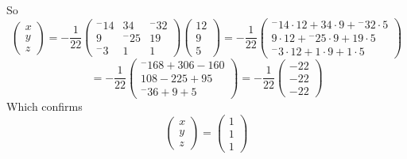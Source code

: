 \documentclass{article}
\begin{document}
\begin{enumerate}
\begin{enumerate}[i.]
So
\[
	\left(
		\begin{array}{c}
			x \\
			y \\
			z
		\end{array}
	\right)
	=
	-\frac{1}{22}
	\left(
		\begin{array}{ccc}
		 {^-}14 &          34 &  {^-}32 \\
		           9 &  {^-}25 &         19  \\
 		    {^-}3 &           1 &           1
		\end{array}	
	\right)
	\left(
		\begin{array}{c}
			12 \\
			9 \\
			5
		\end{array}
	\right)
	=
	-\frac{1}{22}
	\left(
		\begin{array}{c}
			 {^-}14 \cdot 12 +        34 \cdot 9 +  {^-}32 \cdot5 \\
			          9 \cdot 12 + {^-}25 \cdot 9 +         19 \cdot 5 \\
			   {^-}3 \cdot 12 +          1 \cdot 9 +           1 \cdot 5
		\end{array}
	\right)
\]
\[
	=
	-\frac{1}{22}
	\left(
		\begin{array}{c}
			 {^-}168 + 306 - 160 \\
			         108 -  225 + 95 \\
			   {^-} 36+     9 +   5
		\end{array}
	\right)
	=
	-\frac{1}{22}
	\left(
		\begin{array}{c}
			 -22 \\
			 -22 \\
			  -22
		\end{array}
	\right)
\]
Which confirms
\[
	\left(
		\begin{array}{c}
			x \\
			y \\
			z
		\end{array}
	\right)
	=
	\left(
		\begin{array}{c}
			1 \\
			1 \\
			1
		\end{array}
	\right)
\]

\end{enumerate}

\end{enumerate}
\end{document}

